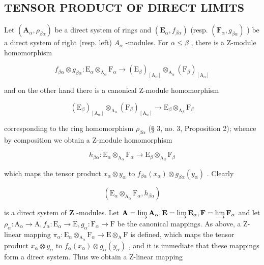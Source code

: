 \subsection{TENSOR PRODUCT OF DIRECT LIMITS}

Let \((\mathbf{A}_{\alpha}, \rho_{\beta\alpha})\) be a direct system of rings and \((\mathbf{E}_{\alpha}, f_{\beta\alpha})\) (resp. \((\mathbf{F}_{\alpha}, g_{\beta\alpha})\) ) be a direct system of right (resp. left) \(A_{\alpha}\) -modules. For \(\alpha \leqslant \beta\) , there is a Z-module homomorphism

\[
f _ {\beta \alpha} \otimes g _ {\beta \alpha}: \mathrm{E} _ {\alpha} \otimes_ {\mathrm{A} _ {\alpha}} \mathrm{F} _ {\alpha} \rightarrow (\mathrm{E} _ {\beta}) _ {[ \mathrm{A} _ {\alpha} ]} \otimes_ {\mathrm{A} _ {\alpha}} (\mathrm{F} _ {\beta}) _ {[ \mathrm{A} _ {\alpha} ]}
\]

and on the other hand there is a canonical Z-module homomorphism

\[
\left(\mathrm{E} _ {\beta}\right) _ {[ \mathrm{A} _ {\alpha} ]} \otimes_ {\mathrm{A} _ {\alpha}} \left(\mathrm{F} _ {\beta}\right) _ {[ \mathrm{A} _ {\alpha} ]} \rightarrow \mathrm{E} _ {\beta} \otimes_ {\mathrm{A} _ {\beta}} \mathrm{F} _ {\beta}
\]

corresponding to the ring homomorphism \(\rho_{\beta \alpha}\) (§ 3, no. 3, Proposition 2); whence by composition we obtain a Z-module homomorphism

\[
h _ {\beta \alpha}: \mathrm{E} _ {\alpha} \otimes_ {\mathrm{A} _ {\alpha}} \mathrm{F} _ {\alpha} \rightarrow \mathrm{E} _ {\beta} \otimes_ {\mathrm{A} _ {\beta}} \mathrm{F} _ {\beta}
\]

which maps the tensor product \(x_{\alpha} \otimes y_{\alpha}\) to \(f_{\beta\alpha}(x_{\alpha}) \otimes g_{\beta\alpha}(y_{\alpha})\) . Clearly

\[
\left(\mathrm{E} _ {\alpha} \otimes_ {\mathrm{A} _ {\alpha}} \mathrm{F} _ {\alpha}, h _ {\beta \alpha}\right)
\]

is a direct system of \(\mathbf{Z}\) -modules. Let \(\mathbf{A} = \varinjlim \mathbf{A}_{\alpha}, \mathbf{E} = \varinjlim \mathbf{E}_{\alpha}, \mathbf{F} = \varinjlim \mathbf{F}_{\alpha}\) and let \(\rho_{\alpha}: \mathrm{A}_{\alpha} \to \mathrm{A}, f_{\alpha}: \mathrm{E}_{\alpha} \to \mathrm{E}, g_{\alpha}: \mathrm{F}_{\alpha} \to \mathrm{F}\) be the canonical mappings. As above, a Z-linear mapping \(\pi_{\alpha}: \mathrm{E}_{\alpha} \otimes_{\mathrm{A}_{\alpha}} \mathrm{F}_{\alpha} \to \mathrm{E} \otimes_{\mathrm{A}} \mathrm{F}\) is defined, which maps the tensor product \(x_{\alpha} \otimes y_{\alpha}\) to \(f_{\alpha}(x_{\alpha}) \otimes g_{\alpha}(y_{\alpha})\) , and it is immediate that these mappings form a direct system. Thus we obtain a Z-linear mapping

